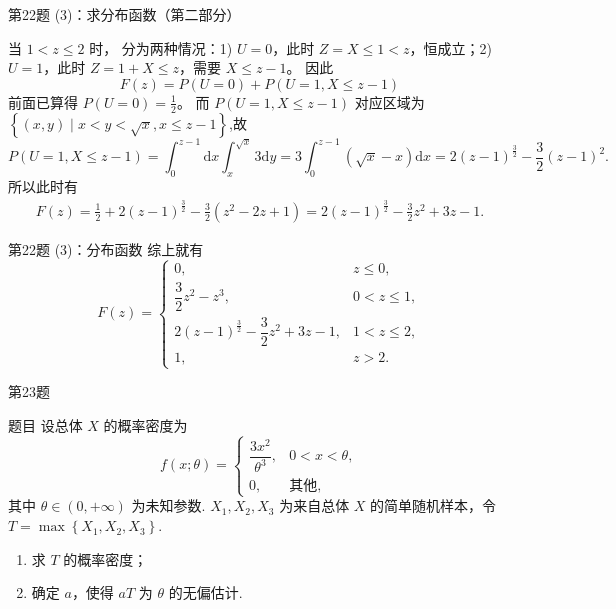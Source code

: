 \documentclass[aspectratio=169]{beamer}
\begin{document}
\begin{frame}{第22题 (3)：求分布函数（第二部分）}
\begin{block}{}
当 \(1 < z \le 2\) 时，
分为两种情况：1) \(U=0\)，此时 \(Z=X \le 1 < z\)，恒成立；2) \(U=1\)，此时 \(Z=1+X \le z\)，需要 \(X \le z-1\)。
因此
\[
F(z) = P(U=0) + P(U=1, X \le z-1)
\]
前面已算得 \(P(U=0) = \frac{1}{2}\)。
而 \(P(U=1, X \le z-1)\) 对应区域为$\left\{ \left( x,y \right) \mid x<y<\sqrt{x},x\le z-1 \right\}$,故
\[
P(U=1,X\le z-1)=\int_0^{z-1}{\mathrm{d}x\int_x^{\sqrt{x}}{3\mathrm{d}y}}=3\int_0^{z-1}{\left( \sqrt{x}-x \right) \mathrm{d}x}=2(z-1)^{\frac{3}{2}}-\frac{3}{2}(z-1)^2.
\]
所以此时有
\begin{align*}
F(z)=\frac{1}{2}+2(z-1)^{\frac{3}{2}}-\frac{3}{2}(z^2-2z+1)=2(z-1)^{\frac{3}{2}}-\frac{3}{2}z^2+3z-1.
\end{align*}
\end{block}
\end{frame}

\begin{frame}{第22题 (3)：分布函数}
综上就有
\[
F(z)= \begin{cases} 0, & z \leqslant 0, \\ \dfrac{3}{2} z^{2}-z^{3}, & 0<z \leqslant 1, \\ 2(z-1)^{\frac{3}{2}}-\dfrac{3}{2} z^{2}+3 z-1, & 1<z \leqslant 2, \\ 1, & z>2. \end{cases}
\]
\end{frame}

\begin{frame}{第23题}
\begin{block}{题目}
设总体 \(X\) 的概率密度为
\[f(x ; \theta)=\begin{cases} \dfrac{3 x^{2}}{\theta^{3}}, & 0<x<\theta, \\ 0, & \text{其他}, \end{cases}\]
其中 \(\theta \in(0,+\infty)\) 为未知参数. \(X_{1},X_{2},X_{3}\) 为来自总体 \(X\) 的简单随机样本，令 \(T=\max \left\{X_{1}, X_{2}, X_{3}\right\}\).
\begin{enumerate}[(1)]
\item 求 \(T\) 的概率密度；
\item 确定 \(a\)，使得 \(aT\) 为 \(\theta\) 的无偏估计.
\end{enumerate}
\end{block}
\end{frame}
\end{document}
